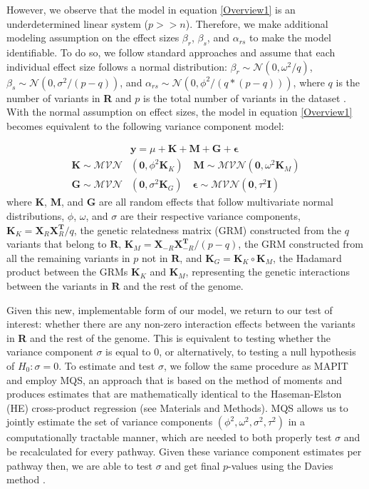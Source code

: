 \documentclass[12pt,a4paper]{article}
\begin{document}
However, we observe that the model in equation \ref{Overview1} is an underdetermined linear system ($p >> n$). Therefore, we make additional modeling assumption on the effect sizes $\beta_r$, $\beta_s$, and $\alpha_{rs}$ to make the model identifiable. To do so, we follow standard approaches \citep{Wu2011,Zhou2013,Yang2010} and assume that each individual effect size follows a normal distribution: $\beta_r \sim \mathcal{N}(0, \omega^2/q)$, $\beta_s \sim \mathcal{N}(0, \sigma^2/(p-q))$, and $\alpha_{rs} \sim \mathcal{N}(0, \phi^2/(q*(p-q)))$, where $q$ is the number of variants in \textbf{R} and $p$ is the total number of variants in the dataset \citep{Crawford2017a}. With the normal assumption on effect sizes, the model in equation \ref{Overview1} becomes equivalent to the following variance component model:

\begin{align}\label{Overview2}
    & \textbf{y} = \mu + \textbf{K} + \textbf{M} + \textbf{G} + \boldsymbol{\epsilon} \\
    \textbf{K} \sim \mathcal{MVN}&(\textbf{0}, \phi^{2}\textbf{K}_K) \quad \textbf{M} \sim \mathcal{MVN}(\textbf{0}, \omega^{2}\textbf{K}_M) \nonumber \\ 
    \textbf{G} \sim \mathcal{MVN}&(\textbf{0}, \sigma^{2}\textbf{K}_G) \quad \boldsymbol{\epsilon} \sim \mathcal{MVN}(\textbf{0}, \tau^{2}\textbf{I}) \nonumber 
\end{align}
where \textbf{K}, \textbf{M}, and \textbf{G} are all random effects that follow multivariate normal distributions, $\phi$, $\omega$, and $\sigma$ are their respective variance components, $\textbf{K}_K = \textbf{X}_{R}\textbf{X}^{\textbf{T}}_{R}/q$, the genetic relatedness matrix (GRM) constructed from the $q$ variants that belong to $\textbf{R}$, $\textbf{K}_M = \textbf{X}_{-R}\textbf{X}^{\textbf{T}}_{-R}/(p-q)$, the GRM constructed from all the remaining variants in $p$ not in $\textbf{R}$, and $\textbf{K}_G = \textbf{K}_K \circ \textbf{K}_M$, the Hadamard product between the GRMs $\textbf{K}_K$ and $\textbf{K}_M$, representing the genetic interactions between the variants in $\textbf{R}$ and the rest of the genome.

Given this new, implementable form of our model, we return to our test of interest: whether there are any non-zero interaction effects between the variants in \textbf{R} and the rest of the genome. This is equivalent to testing whether the variance component $\sigma$ is equal to 0, or alternatively, to testing a null hypothesis of $H_0: \sigma = 0$. To estimate and test $\sigma$, we follow the same procedure as MAPIT and employ MQS, an approach that is based on the method of moments and produces estimates that are mathematically identical to the Haseman-Elston (HE) cross-product regression \citep{Haseman1972, Zhou2017} (see Materials and Methods). MQS allows us to jointly estimate the set of variance components $(\phi^{2}, \omega^{2}, \sigma^{2}, \tau^{2})$ in a computationally tractable manner, which are needed to both properly test $\sigma$ and be recalculated for every pathway. Given these variance component estimates per pathway then, we are able to test $\sigma$ and get final $p$-values using the Davies method \citep{Crawford2017a,Davies1980}.  
\end{document}
